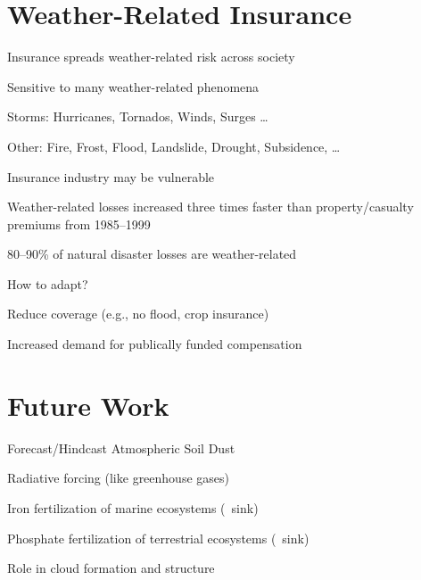 \documentclass[12pt]{article}
\begin{document}
\section[Weather-Related Insurance]{Weather-Related Insurance}
\begin{itemize*}
\item Insurance spreads weather-related risk across society
\item Sensitive to many weather-related phenomena
\begin{itemize*}
\item Storms: Hurricanes, Tornados, Winds, Surges \ldots
\item Other: Fire, Frost, Flood, Landslide, Drought, Subsidence, \ldots
\end{itemize*}
\item Insurance industry may be vulnerable
\begin{itemize*}
\item Weather-related losses increased three times faster than
property/casualty premiums from 1985--1999 
\item 80--90\% of natural disaster losses are weather-related
\end{itemize*}
\item How to adapt?
\begin{itemize*}
\item Reduce coverage (e.g., no flood, crop insurance)
\item Increased demand for publically funded compensation
\end{itemize*}
\end{itemize*}
\vfill

\section[Future Work]{Future Work}
\begin{itemize*}
\item Forecast/Hindcast Atmospheric Soil Dust
\begin{itemize*}
\item Radiative forcing (like greenhouse gases)
\item Iron fertilization of marine ecosystems (\COd\ sink)
\item Phosphate fertilization of terrestrial ecosystems (\COd\ sink)
\item Role in cloud formation and structure
\end{itemize*}
\end{itemize*}
\vfill
\end{document}

